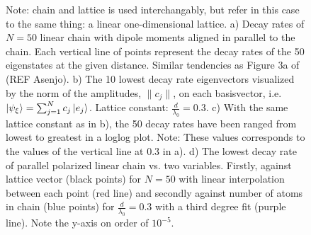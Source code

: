 \documentclass{article}
\begin{document}
\begin{figure}[H]
    \caption{Note: chain and lattice is used interchangably, but refer in this case to the same thing: a linear one-dimensional lattice. a) Decay rates of $N=50$ linear chain with dipole moments aligned in parallel to the chain. Each vertical line of points represent the decay rates of the 50 eigenstates at the given distance. Similar tendencies as Figure 3a of (REF Asenjo). b) The 10 lowest decay rate eigenvectors visualized by the norm of the amplitudes, $\| c_j \|$, on each basisvector, i.e. $\ket{\psi_\xi} = \sum_{j=1}^N c_j \ket{e_j}$. Lattice constant: $\frac{d}{\lambda_0} = 0.3$. c) With the same lattice constant as in b), the 50 decay rates have been ranged from lowest to greatest in a loglog plot. Note: These values corresponds to the values of the vertical line at 0.3 in a). d) The lowest decay rate of parallel polarized linear chain vs. two variables. Firstly, against lattice vector (black points) for $N=50$ with linear interpolation between each point (red line) and secondly against number of atoms in chain (blue points) for $\frac{d}{\lambda_0} = 0.3$ with a third degree fit (purple line). Note the y-axis on order of $10^{-5}$. }
    \label{fig:fig1}
\end{figure}
\end{document}
